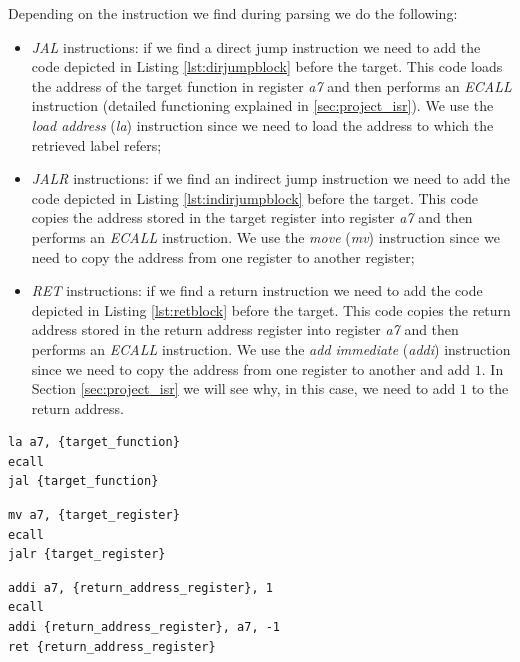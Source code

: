 Depending on the instruction we find during parsing we do the following:
\begin{itemize}
  \item \textit{JAL} instructions: if we find a direct jump instruction we need to
    add the code depicted in Listing \ref{lst:dirjumpblock} before the target.
    This code loads the address of the target function in register \textit{a7} and
    then performs an \textit{ECALL} instruction (detailed functioning explained in
    \ref{sec:project_isr}). We use the \textit{load address} (\textit{la}) instruction
    since we need to load the address to which the retrieved label refers;

  \item \textit{JALR} instructions: if we find an indirect jump instruction we need
    to add the code depicted in Listing \ref{lst:indirjumpblock} before the target.
    This code copies the address stored in the target register into register
    \textit{a7} and then performs an \textit{ECALL} instruction. We use the \textit{move}
    (\textit{mv}) instruction since we need to copy the address from one register
    to another register;

  \item \textit{RET} instructions: if we find a return instruction we need to add
    the code depicted in Listing \ref{lst:retblock} before the target. This code
    copies the return address stored in the return address register into
    register \textit{a7} and then performs an \textit{ECALL} instruction. We use
    the \textit{add immediate} (\textit{addi}) instruction since we need to copy
    the address from one register to another and add $1$. In Section
    \ref{sec:project_isr} we will see why, in this case, we need to add $1$ to
    the return address.
\end{itemize}

\begin{lstlisting}[style=Assembly, caption = Direct jump code block, label={lst:dirjumpblock}]
la a7, {target_function}
ecall
jal {target_function}
\end{lstlisting}

\begin{lstlisting}[style=Assembly, caption = Indirect jump code block, label={lst:indirjumpblock}]
mv a7, {target_register}
ecall
jalr {target_register}
\end{lstlisting}

\begin{lstlisting}[style=Assembly, caption = Return code block, label={lst:retblock}]
addi a7, {return_address_register}, 1
ecall
addi {return_address_register}, a7, -1
ret {return_address_register}
\end{lstlisting}

